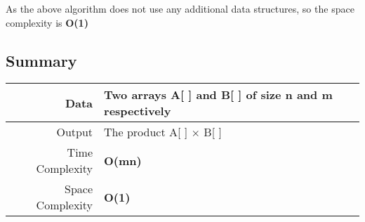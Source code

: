 \documentclass[12pt,a4paper,titlepage]{article}
\begin{document}
As the above algorithm does not use any additional data structures, so the space complexity is \textbf{O(1)}
\subsection{Summary}
\begin{tabular}{|r|l|}
\hline
Data & Two arrays A[ ] and B[ ] of size n and m respectively\\ 
\hline
Output & The product A[ ] $\times$ B[ ]\\
\hline
Time Complexity & \textbf{O(mn)}\\
\hline
Space Complexity & \textbf{O(1)}\\
\hline
\end{tabular}
\end{document}
